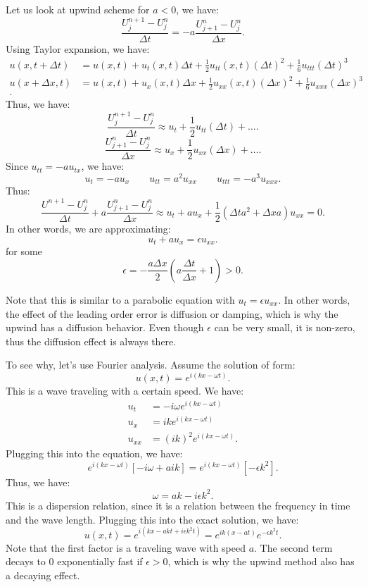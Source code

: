 \documentclass[../main/main.tex]{subfiles}
\begin{document}
Let us look at upwind scheme for $a<0$, we have: \[
 \frac{U_j^{n+1}-U^n_j}{\Delta t} = -a \frac{U_{j+1}^n-U^n_j}{\Delta x}
.\] Using Taylor expansion, we have: 
\begin{align*}
    u(x, t+ \Delta t) &= u(x,t) + u_t(x,t) \Delta t + \frac{1}{2}u_{t t}(x,t) (\Delta t)^2 + \frac{1}{6} u_{t t t}(\Delta t)^{3} \\
    u(x + \Delta x, t) &= u(x,t) + u_x(x,t) \Delta x + \frac{1}{2}u_{x x}(x,t) (\Delta x)^2 + \frac{1}{6} u_{x x x}(\Delta x)^{3} \\
.\end{align*}
Thus, we have: \[
    \frac{U_{j}^{n+1}-U^n_j}{\Delta t}\approx u_t + \frac{1}{2}u_{ t t} (\Delta t) + \ldots
.\] \[ 
    \frac{U_{j+1}^{n}-U^n_j}{\Delta x}\approx u_x + \frac{1}{2}u_{ x x} (\Delta x) + \ldots
.\] Since $u_{t t} = -a u_{tx}$, we have: \[
u_t = -au_x \quad \quad u_{t t }= a^2 u_{ x x} \quad \quad u_{ t t t} =- a^3 u_{x x x} 
.\] 
Thus: \[
    \frac{U^{n+1}- U^n_j}{\Delta t} + a \frac{U_{j+1}^n - U^n_j}{\Delta x} \approx u_t + a u_x + \frac{1}{2}\left( \Delta t a^2 + \Delta x a \right) u_{x x} = 0
.\]
In other words, we are approximating: \[
u_t + a u_x = \epsilon u_{x x} 
.\] for some \[
\epsilon = - \frac{a \Delta x}{2}\left( a \frac{\Delta t}{\Delta x}+1 \right) >0
.\] 
\begin{remark} 
    Note that this is similar to a parabolic equation with $u_t = \epsilon u_{ x x}$. In other words, the effect of the leading order error is diffusion or damping, which is why the upwind has a diffusion behavior. Even though $\epsilon$ can be very small, it is non-zero, thus the diffusion effect is always there.
\end{remark} 
To see why, let's use Fourier analysis. Assume the solution of form: \[
u(x,t) = e^{i(kx-\omega t)}
.\] This is a wave traveling with a  certain speed. We have: 
\begin{align*} 
    u_t &= -i\omega e^{i(kx-\omega t)}\\
    u_x &= ik e^{i(kx-\omega t)} \\
    u_{x x} &= (ik)^2 e^{i(kx-\omega t)}
.\end{align*}
Plugging this into the equation, we have: \[
    e^{i(kx-\omega t)}\left[ -i\omega + aik \right] = e^{i(kx - \omega t)}[-\epsilon k^2]
.\] 
Thus, we have: \[
\omega = ak - i\epsilon k^2
.\] This is a dispersion relation, since it is a relation between the frequency in time and the wave length. Plugging this into the exact solution, we have: \[
u(x,t) = e^{i(kx-akt+i\epsilon k^2t)} = e^{ik(x-at)}e^{-\epsilon k^2 t}
.\]Note that the first factor is a traveling wave with speed $a$. The second term decays to 0 exponentially fast if $\epsilon >0$, which is why the upwind method also has a decaying effect.
\end{document}
